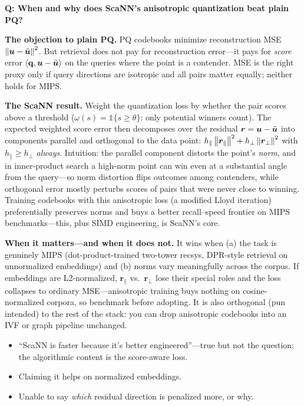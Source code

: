 \begin{interviewq}
\textbf{Q: When and why does ScaNN's anisotropic quantization beat plain PQ?}

 \quad {} \quad \badgefreq{\freqlow}

\stronganswer

\textbf{The objection to plain PQ.} PQ codebooks minimize reconstruction MSE $\left\lVert\bm{u} - \tilde{\bm{u}}\right\rVert^2$. But retrieval does not pay for reconstruction error---it pays for \emph{score} error $\langle\mathbf{q},\bm{u} - \tilde{\bm{u}}\rangle$ on the queries where the point is a contender. MSE is the right proxy only if query directions are isotropic and all pairs matter equally; neither holds for MIPS.

\textbf{The ScaNN result.} Weight the quantization loss by whether the pair scores above a threshold ($\omega(s) = \mathds{1}\{s \ge \theta\}$: only potential winners count). The expected weighted score error then decomposes over the residual $\bm{r} = \bm{u} - \tilde{\bm{u}}$ into components parallel and orthogonal to the data point: $h_{\parallel}\left\lVert\bm{r}_{\parallel}\right\rVert^2 + h_{\perp}\left\lVert\bm{r}_{\perp}\right\rVert^2$ with $h_{\parallel} \ge h_{\perp}$ \emph{always}. Intuition: the parallel component distorts the point's \emph{norm}, and in inner-product search a high-norm point can win even at a substantial angle from the query---so norm distortion flips outcomes among contenders, while orthogonal error mostly perturbs scores of pairs that were never close to winning. Training codebooks with this anisotropic loss (a modified Lloyd iteration) preferentially preserves norms and buys a better recall--speed frontier on MIPS benchmarks---this, plus SIMD engineering, is ScaNN's core.

\textbf{When it matters---and when it does not.} It wins when (a) the task is genuinely MIPS (dot-product-trained two-tower recsys, DPR-style retrieval on unnormalized embeddings) and (b) norms vary meaningfully across the corpus. If embeddings are L2-normalized, $\bm{r}_{\parallel}$ vs.\ $\bm{r}_{\perp}$ lose their special roles and the loss collapses to ordinary MSE---anisotropic training buys nothing on cosine-normalized corpora, so benchmark before adopting. It is also orthogonal (pun intended) to the rest of the stack: you can drop anisotropic codebooks into an IVF or graph pipeline unchanged.

\redflags
\begin{itemize}
    \item ``ScaNN is faster because it's better engineered''---true but not the question; the algorithmic content is the score-aware loss.
    \item Claiming it helps on normalized embeddings.
    \item Unable to say \emph{which} residual direction is penalized more, or why.
\end{itemize}


\end{interviewq}
